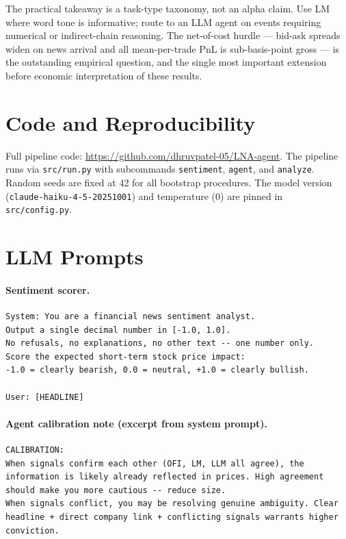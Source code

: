 \documentclass[11pt, letterpaper]{article}
\begin{document}
The practical takeaway is a task-type taxonomy, not an alpha claim. Use LM where
word tone is informative; route to an LLM agent on events requiring numerical or
indirect-chain reasoning. The net-of-cost hurdle --- bid-ask spreads widen on news
arrival and all mean-per-trade PnL is sub-basis-point gross --- is the outstanding
empirical question, and the single most important extension before economic
interpretation of these results.

\section*{Code and Reproducibility}

Full pipeline code: \url{https://github.com/dhruvpatel-05/LNA-agent}. The pipeline runs via
\texttt{src/run.py} with subcommands \texttt{sentiment}, \texttt{agent}, and
\texttt{analyze}. Random seeds are fixed at 42 for all bootstrap procedures. The
model version (\texttt{claude-haiku-4-5-20251001}) and temperature (0) are pinned
in \texttt{src/config.py}.

\appendix

\section{LLM Prompts}
\label{app:prompt}

\paragraph{Sentiment scorer.}
\begin{verbatim}
System: You are a financial news sentiment analyst.
Output a single decimal number in [-1.0, 1.0].
No refusals, no explanations, no other text -- one number only.
Score the expected short-term stock price impact:
-1.0 = clearly bearish, 0.0 = neutral, +1.0 = clearly bullish.

User: [HEADLINE]
\end{verbatim}

\paragraph{Agent calibration note (excerpt from system prompt).}
\begin{verbatim}
CALIBRATION:
When signals confirm each other (OFI, LM, LLM all agree), the
information is likely already reflected in prices. High agreement
should make you more cautious -- reduce size.
When signals conflict, you may be resolving genuine ambiguity. Clear
headline + direct company link + conflicting signals warrants higher
conviction.
\end{verbatim}
\end{document}
